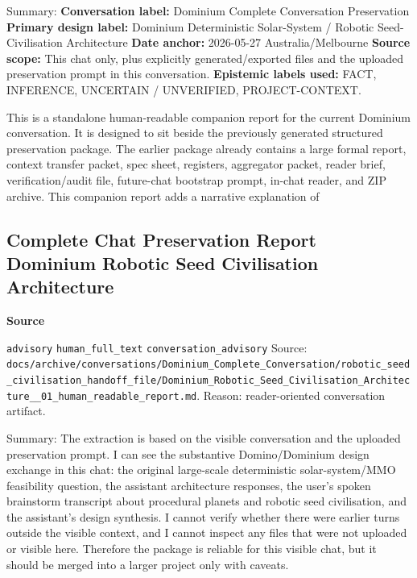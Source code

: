 \documentclass[9pt,a4paper,openany]{book}
\newcommand{\vonecallout}[3]{\par\medskip\noindent\begingroup\setlength{\fboxsep}{7pt}\colorbox{DomCalloutBg}{\parbox{0.94\linewidth}{\textbf{\textcolor{#1}{#2}}\par #3}}\endgroup\par\medskip}
\begin{document}
Summary: \textbf{Conversation label:} Dominium Complete Conversation Preservation \textbf{Primary design label:} Dominium Deterministic Solar-\allowbreak{}System /\allowbreak{} Robotic Seed-\allowbreak{}Civilisation Architecture \textbf{Date anchor:} 2026-\allowbreak{}05-\allowbreak{}27 Australia/\allowbreak{}Melbourne \textbf{Source scope:} This chat only, plus explicitly generated/\allowbreak{}exported files and the uploaded preservation prompt in this conversation.\allowbreak{} \textbf{Epistemic labels used:} FACT, INFERENCE, UNCERTAIN /\allowbreak{} UNVERIFIED, PROJECT-\allowbreak{}CONTEXT.\allowbreak{}


This is a standalone human-\allowbreak{}readable companion report for the current Dominium conversation.\allowbreak{} It is designed to sit beside the previously generated structured preservation package.\allowbreak{} The earlier package already contains a large formal report, context transfer packet, spec sheet, registers, aggregator packet, reader brief, verification/\allowbreak{}audit file, future-\allowbreak{}chat bootstrap prompt, in-\allowbreak{}chat reader, and ZIP archive.\allowbreak{} This companion report adds a narrative explanation of



\subsection{Complete Chat Preservation Report Dominium Robotic Seed Civilisation Architecture}

\vonecallout{DomSlate}{Source}{\texttt{advisory} \texttt{human\_\allowbreak{}full\_\allowbreak{}text} \texttt{conversation\_\allowbreak{}advisory} Source: \texttt{docs/\allowbreak{}archive/\allowbreak{}conversations/\allowbreak{}Dominium\_\allowbreak{}Complete\_\allowbreak{}Conversation/\allowbreak{}robotic\_\allowbreak{}seed\_\allowbreak{}civilisation\_\allowbreak{}handoff\_\allowbreak{}file/\allowbreak{}Dominium\_\allowbreak{}Robotic\_\allowbreak{}Seed\_\allowbreak{}Civilisation\_\allowbreak{}Architecture\_\allowbreak{}\_\allowbreak{}01\_\allowbreak{}human\_\allowbreak{}readable\_\allowbreak{}report.\allowbreak{}md}.\allowbreak{} Reason: reader-\allowbreak{}oriented conversation artifact.\allowbreak{}}

Summary: The extraction is based on the visible conversation and the uploaded preservation prompt.\allowbreak{} I can see the substantive Domino/\allowbreak{}Dominium design exchange in this chat: the original large-\allowbreak{}scale deterministic solar-\allowbreak{}system/\allowbreak{}MMO feasibility question, the assistant architecture responses, the user's spoken brainstorm transcript about procedural planets and robotic seed civilisation, and the assistant's design synthesis.\allowbreak{} I cannot verify whether there were earlier turns outside the visible context, and I cannot inspect any files that were not uploaded or visible here.\allowbreak{} Therefore the package is reliable for this visible chat, but it should be merged into a larger project only with caveats.\allowbreak{}
\end{document}
